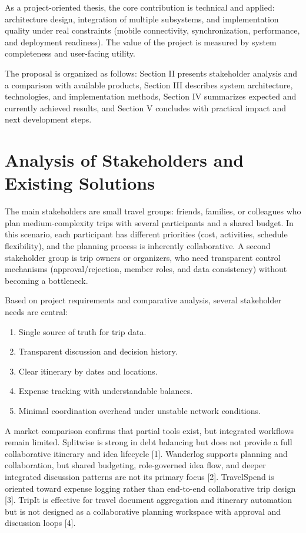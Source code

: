 \documentclass[10pt,twocolumn]{article}
\begin{document}
As a project-oriented thesis, the core contribution is technical and applied: architecture design, integration of multiple subsystems, and implementation quality under real constraints (mobile connectivity, synchronization, performance, and deployment readiness). The value of the project is measured by system completeness and user-facing utility.

The proposal is organized as follows: Section II presents stakeholder analysis and a comparison with available products, Section III describes system architecture, technologies, and implementation methods, Section IV summarizes expected and currently achieved results, and Section V concludes with practical impact and next development steps.

\section{Analysis of Stakeholders and Existing Solutions}

The main stakeholders are small travel groups: friends, families, or colleagues who plan medium-complexity trips with several participants and a shared budget. In this scenario, each participant has different priorities (cost, activities, schedule flexibility), and the planning process is inherently collaborative. A second stakeholder group is trip owners or organizers, who need transparent control mechanisms (approval/rejection, member roles, and data consistency) without becoming a bottleneck.

Based on project requirements and comparative analysis, several stakeholder needs are central:
\begin{enumerate}
\item Single source of truth for trip data.
\item Transparent discussion and decision history.
\item Clear itinerary by dates and locations.
\item Expense tracking with understandable balances.
\item Minimal coordination overhead under unstable network conditions.
\end{enumerate}

A market comparison confirms that partial tools exist, but integrated workflows remain limited. Splitwise is strong in debt balancing but does not provide a full collaborative itinerary and idea lifecycle [1]. Wanderlog supports planning and collaboration, but shared budgeting, role-governed idea flow, and deeper integrated discussion patterns are not its primary focus [2]. TravelSpend is oriented toward expense logging rather than end-to-end collaborative trip design [3]. TripIt is effective for travel document aggregation and itinerary automation but is not designed as a collaborative planning workspace with approval and discussion loops [4].
\end{document}
